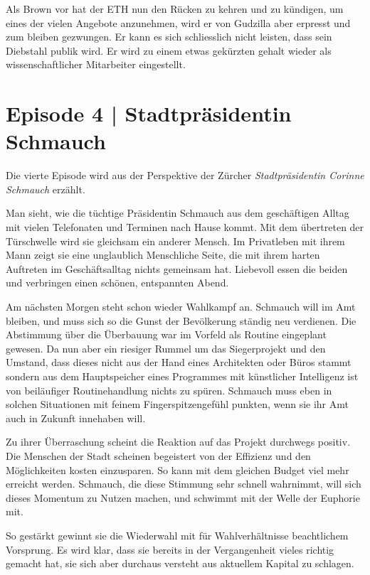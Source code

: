 \documentclass[11pt,a4paper,ngerman]{scrreprt}
\begin{document}
Als Brown vor hat der ETH nun den Rücken zu kehren und zu kündigen, um eines
der vielen Angebote anzunehmen, wird er von Gudzilla aber erpresst und zum
bleiben gezwungen. Er kann es sich schliesslich nicht leisten, dass sein
Diebstahl publik wird. Er wird zu einem etwas gekürzten gehalt wieder als
wissenschaftlicher Mitarbeiter eingestellt.

\section*{Episode 4 | Stadtpräsidentin Schmauch}

Die vierte Episode wird aus der Perspektive der Zürcher \emph{Stadtpräsidentin
Corinne Schmauch} erzählt.

Man sieht, wie die tüchtige Präsidentin Schmauch aus dem geschäftigen Alltag
mit vielen Telefonaten und Terminen nach Hause kommt. Mit dem übertreten der
Türschwelle wird sie gleichsam ein anderer Mensch. Im Privatleben mit ihrem
Mann zeigt sie eine unglaublich Menschliche Seite, die mit ihrem harten
Auftreten im Geschäftsalltag nichts gemeinsam hat. Liebevoll essen die beiden
und verbringen einen schönen, entspannten Abend.

Am nächsten Morgen steht schon wieder Wahlkampf an. Schmauch will im Amt
bleiben, und muss sich so die Gunst der Bevölkerung ständig neu
verdienen. Die Abstimmung über die Überbauung war im Vorfeld als Routine
eingeplant gewesen. Da nun aber ein riesiger Rummel um das Siegerprojekt und
den Umstand, dass dieses nicht aus der Hand eines Architekten oder Büros
stammt sondern aus dem Hauptspeicher eines Programmes mit künstlicher
Intelligenz ist von beiläufiger Routinehandlung nichts zu spüren. Schmauch
muss eben in solchen Situationen mit feinem Fingerspitzengefühl punkten, wenn
sie ihr Amt auch in Zukunft innehaben will.

Zu ihrer Überraschung scheint die Reaktion auf das Projekt durchwegs
positiv. Die Menschen der Stadt scheinen begeistert von der Effizienz und den
Möglichkeiten kosten einzusparen. So kann mit dem gleichen Budget viel mehr
erreicht werden. Schmauch, die diese Stimmung sehr schnell wahrnimmt, will
sich dieses Momentum zu Nutzen machen, und schwimmt mit der Welle der
Euphorie mit.

So gestärkt gewinnt sie die Wiederwahl mit für Wahlverhältnisse beachtlichem
Vorsprung. Es wird klar, dass sie bereits in der Vergangenheit vieles richtig
gemacht hat, sie sich aber durchaus versteht aus aktuellem Kapital zu
schlagen.
\end{document}
